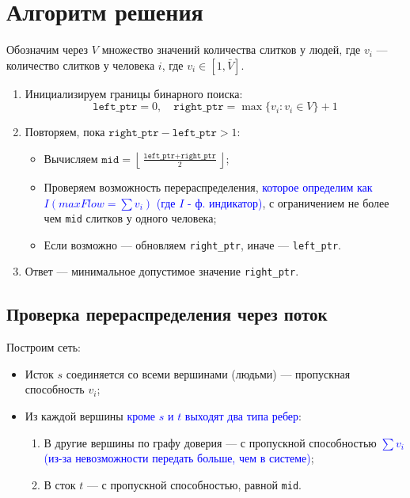 \documentclass{article}
\begin{document}
\section{Алгоритм решения}

Обозначим через $V$ множество значений количества слитков у людей, где $v_i$ — количество слитков у человека $i$, где $v_i \in [1, \bar{V}]$.

\begin{enumerate}
    \item Инициализируем границы бинарного поиска:
          \[
              \texttt{left\_ptr} = 0,\quad \texttt{right\_ptr} = \max\{v_i : v_i \in V\} + 1
          \]

    \item Повторяем, пока $\texttt{right\_ptr} - \texttt{left\_ptr} > 1$:
          \begin{itemize}
              \item Вычисляем $\texttt{mid} = \left\lfloor \frac{\texttt{left\_ptr} + \texttt{right\_ptr}}{2} \right\rfloor$;
              \item Проверяем возможность перераспределения, \textcolor{blue}{которое определим как $I(maxFlow = \sum{v_i})$ (где $I$ - ф. индикатор)}, с ограничением не более чем \texttt{mid} слитков у одного человека;
              \item Если возможно — обновляем \texttt{right\_ptr}, иначе — \texttt{left\_ptr}.
          \end{itemize}

    \item Ответ — минимальное допустимое значение \texttt{right\_ptr}.
\end{enumerate}

\subsection{Проверка перераспределения через поток}

Построим сеть:
\begin{itemize}
    \item Исток $s$ соединяется со всеми вершинами (людьми) — пропускная способность $v_i$;
    \item Из каждой вершины \textcolor{blue}{кроме $s$ и $t$ выходят два типа ребер}:
          \begin{enumerate}
              \item В другие вершины по графу доверия — с пропускной способностью \textcolor{blue}{$\sum{v_i}$ (из-за невозможности передать больше, чем в системе)};
              \item В сток $t$ — с пропускной способностью, равной \texttt{mid}.
          \end{enumerate}
\end{itemize}
\end{document}
